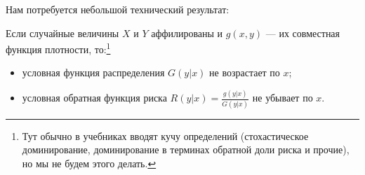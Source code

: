 Нам потребуется небольшой технический результат:
\begin{myth}
Если случайные величины $ X $ и $ Y $ аффилированы и $ g(x,y) $ — их совместная функция плотности, то:\footnote{Тут обычно в учебниках вводят кучу определений (стохастическое доминирование, доминирование в терминах обратной доли риска и прочие), но мы не будем этого делать.}
\begin{itemize}
\item условная функция распределения $ G(y|x)$ не возрастает по $ x $;
\item условная обратная функция риска  $ R(y|x)=\frac{g(y|x)}{G(y|x)} $ не убывает по $ x $.
\end{itemize}
\end{myth}
